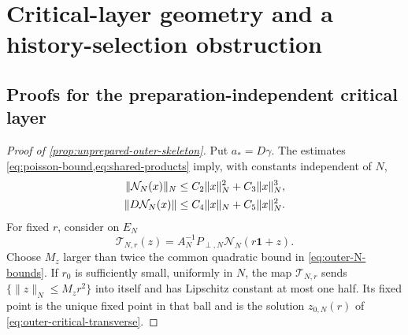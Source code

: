 \section{Critical-layer geometry and a history-selection obstruction}
\label{sec:supplementary-outer-skeleton}

\subsection{Proofs for the preparation-independent critical layer}

\begin{proof}[Proof of \cref{prop:unprepared-outer-skeleton}]
Put \(a_*=D\gamma\).  The estimates
\cref{eq:poisson-bound,eq:shared-products} imply, with constants independent
of \(N\),
\begin{align}
 \|\mathcal N_N(x)\|_N
 &\le C_2\|x\|_N^2+C_3\|x\|_N^3,\notag\\
 \|D\mathcal N_N(x)\|
 &\le C_4\|x\|_N+C_5\|x\|_N^2.                     \label{eq:outer-N-bounds}
\end{align}
For fixed \(r\), consider on \(E_N\)
\begin{equation}
 \mathcal T_{N,r}(z)=A_N^{-1}P_{\perp,N}
       \mathcal N_N(r\mathbf1+z).                   \label{eq:outer-critical-contraction}
\end{equation}
Choose \(M_z\) larger than twice the common quadratic bound in
\cref{eq:outer-N-bounds}.  If \(r_0\) is sufficiently small, uniformly in
\(N\), the map \(\mathcal T_{N,r}\) sends
\(\{\|z\|_N\le M_zr^2\}\) into itself and has Lipschitz constant at most
one half.  Its fixed point is the unique fixed point in that ball and is the
solution \(z_{0,N}(r)\) of \cref{eq:outer-critical-transverse}.


\end{proof}
